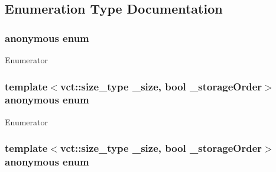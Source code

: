 \subsection{Enumeration Type Documentation}
\hypertarget{group__cisst_numerical_gad99b8f3eaeb516bd937224b0209b27f0}{}\subsubsection[{anonymous enum}]{\setlength{\rightskip}{0pt plus 5cm}anonymous enum}\label{group__cisst_numerical_gad99b8f3eaeb516bd937224b0209b27f0}
\begin{Desc}
\item[Enumerator]\par
\begin{description}
\item[{\em 
\hypertarget{group__cisst_numerical_ggad99b8f3eaeb516bd937224b0209b27f0a7aa4b91bbfeaafff839f5290659f8067}{}N\+B\label{group__cisst_numerical_ggad99b8f3eaeb516bd937224b0209b27f0a7aa4b91bbfeaafff839f5290659f8067}
}]\end{description}
\end{Desc}
\hypertarget{group__cisst_numerical_gaa798f7b73968be3cc5c25f84f177a087}{}\subsubsection[{anonymous enum}]{\setlength{\rightskip}{0pt plus 5cm}template$<$vct\+::size\+\_\+type \+\_\+size, bool \+\_\+storage\+Order$>$ anonymous enum}\label{group__cisst_numerical_gaa798f7b73968be3cc5c25f84f177a087}
\begin{Desc}
\item[Enumerator]\par
\begin{description}
\item[{\em 
\hypertarget{group__cisst_numerical_ggaa798f7b73968be3cc5c25f84f177a087ab8624d51cb7feed9f3452930fadcb46b}{}M\+A\+X\+\_\+\+S\+I\+Z\+E\+\_\+1\label{group__cisst_numerical_ggaa798f7b73968be3cc5c25f84f177a087ab8624d51cb7feed9f3452930fadcb46b}
}]\end{description}
\end{Desc}
\hypertarget{group__cisst_numerical_ga9faf581415b6d28c6eec597d66949f1d}{}\subsubsection[{anonymous enum}]{\setlength{\rightskip}{0pt plus 5cm}template$<$vct\+::size\+\_\+type \+\_\+size, bool \+\_\+storage\+Order$>$ anonymous enum}\label{group__cisst_numerical_ga9faf581415b6d28c6eec597d66949f1d}
